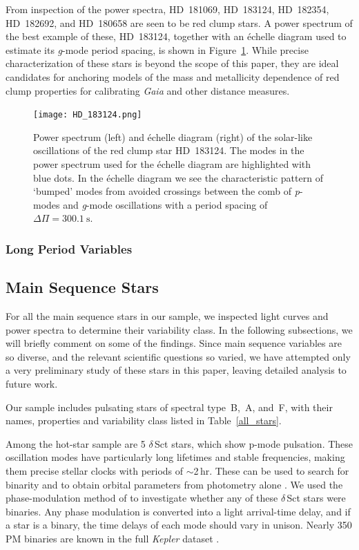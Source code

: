 \documentclass[a4paper,fleqn,usenatbib]{mnras}
\newcommand{\gaia}{\emph{Gaia}\xspace}
\begin{document}
From inspection of the power spectra, HD~181069, HD~183124, HD~182354, HD~182692, and HD~180658 are seen to be red clump stars. A power spectrum of the best example of these, HD~183124, together with an \'{e}chelle diagram used to estimate its \emph{g}-mode period spacing, is shown in Figure~\ref{HD_183124}. While precise characterization of these stars is beyond the scope of this paper, they are ideal candidates for anchoring models of the mass and metallicity dependence of red clump properties for calibrating \gaia and other distance measures. 

\begin{figure}
\noindent\texttt{[image: HD\_183124.png]}

\caption{\label{HD_183124}
Power spectrum (left) and \'{e}chelle diagram (right) of the solar-like oscillations of the red clump star HD~183124. The modes in the power spectrum used for the \'{e}chelle diagram are highlighted with blue dots. In the \'{e}chelle diagram we see the characteristic pattern of `bumped' modes from avoided crossings between the comb of \emph{p}-modes and \emph{g}-mode oscillations with a period spacing of $\Delta \Pi = 300.1~\text{s}$.}
\end{figure}

\subsubsection{Long Period Variables}
\label{lpvs}

\subsection{Main Sequence Stars}
\label{mainseq}

For all the main sequence stars in our sample, we inspected light curves and power spectra to determine their variability class. In the following subsections, we will briefly comment on some of the findings. Since main sequence variables are so diverse, and the relevant scientific questions so varied, we have attempted only a very preliminary study of these stars in this paper, leaving detailed analysis to future work.

Our sample includes pulsating stars of spectral type~B,~A, and~F, with their names, properties and variability class listed in Table~\ref{all_stars}. 

Among the hot-star sample are 5 $\delta$\,Sct stars, which show p-mode pulsation. These oscillation modes have particularly long lifetimes and stable frequencies, making them precise stellar clocks with periods of $\sim$2\,hr. These can be used to search for binarity and to obtain orbital parameters from photometry alone \citep{shibahashi&kurtz2012}. We used the phase-modulation method of \citet{murphyetal2014} to investigate whether any of these $\delta$\,Sct stars were binaries. Any phase modulation is converted into a light arrival-time delay, and if a star is a binary, the time delays of each mode should vary in unison. Nearly 350 PM binaries are known in the full \textit{Kepler} dataset \citep{murphyetal2018}.
\end{document}
